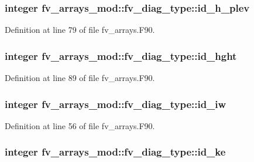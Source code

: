 \subsubsection[{id\-\_\-h\-\_\-plev}]{\setlength{\rightskip}{0pt plus 5cm}integer fv\-\_\-arrays\-\_\-mod\-::fv\-\_\-diag\-\_\-type\-::id\-\_\-h\-\_\-plev}\label{structfv__arrays__mod_1_1fv__diag__type_a0f76fef7927923ca7cd5a87b9fe741fa}


Definition at line 79 of file fv\-\_\-arrays.\-F90.

\subsubsection[{id\-\_\-hght}]{\setlength{\rightskip}{0pt plus 5cm}integer fv\-\_\-arrays\-\_\-mod\-::fv\-\_\-diag\-\_\-type\-::id\-\_\-hght}\label{structfv__arrays__mod_1_1fv__diag__type_aed92d984c51120a8e1c0603c157b8c1b}


Definition at line 89 of file fv\-\_\-arrays.\-F90.

\subsubsection[{id\-\_\-iw}]{\setlength{\rightskip}{0pt plus 5cm}integer fv\-\_\-arrays\-\_\-mod\-::fv\-\_\-diag\-\_\-type\-::id\-\_\-iw}\label{structfv__arrays__mod_1_1fv__diag__type_a9b2eac321b165245061be9c01e9c2027}


Definition at line 56 of file fv\-\_\-arrays.\-F90.

\subsubsection[{id\-\_\-ke}]{\setlength{\rightskip}{0pt plus 5cm}integer fv\-\_\-arrays\-\_\-mod\-::fv\-\_\-diag\-\_\-type\-::id\-\_\-ke}\label{structfv__arrays__mod_1_1fv__diag__type_a74b808c1e2b1f127e9336784184f6426}


